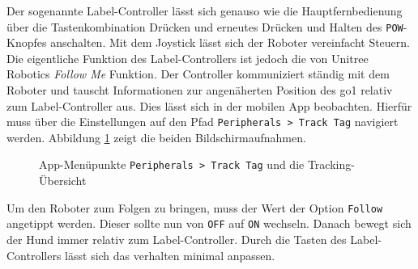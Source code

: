 Der sogenannte Label-Controller lässt sich genauso wie die Hauptfernbedienung über die Tastenkombination Drücken und
erneutes Drücken und Halten des \texttt{POW}-Knopfes anschalten.
Mit dem Joystick lässt sich der Roboter vereinfacht Steuern.
Die eigentliche Funktion des Label-Controllers ist jedoch die von Unitree Robotics \emph{Follow Me} Funktion.
Der Controller kommuniziert ständig mit dem Roboter und tauscht Informationen zur angenäherten Position des \gls{go1} relativ
zum Label-Controller aus.
Dies lässt sich in der mobilen App beobachten.
Hierfür muss über die Einstellungen auf den Pfad \texttt{Peripherals > Track Tag} navigiert werden.
Abbildung \ref{fig:follow-me} zeigt die beiden Bildschirmaufnahmen.

\begin{figure}[h]
    \caption{App-Menüpunkte \texttt{Peripherals > Track Tag} und die Tracking-Übersicht}\label{fig:follow-me}
\end{figure}

Um den Roboter zum Folgen zu bringen, muss der Wert der Option \texttt{Follow} angetippt werden.
Dieser sollte nun von \texttt{OFF} auf \texttt{ON} wechseln.
Danach bewegt sich der Hund immer relativ zum Label-Controller.
Durch die Tasten des Label-Controllers lässt sich das verhalten minimal anpassen.

